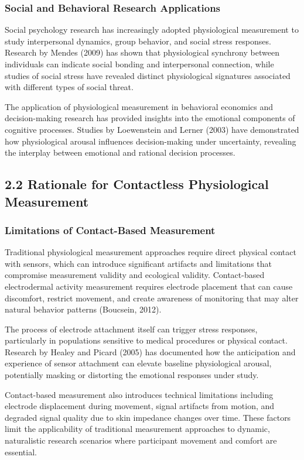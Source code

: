 \documentclass[11pt,a4paper]{article}
\begin{document}
\subsubsection{Social and Behavioral Research Applications}

Social psychology research has increasingly adopted physiological measurement to study interpersonal dynamics, group
behavior, and social stress responses. Research by Mendes (2009) has shown that physiological synchrony between
individuals can indicate social bonding and interpersonal connection, while studies of social stress have revealed
distinct physiological signatures associated with different types of social threat.

The application of physiological measurement in behavioral economics and decision-making research has provided insights
into the emotional components of cognitive processes. Studies by Loewenstein and Lerner (2003) have demonstrated how
physiological arousal influences decision-making under uncertainty, revealing the interplay between emotional and
rational decision processes.

\subsection{2.2 Rationale for Contactless Physiological Measurement}

\subsubsection{Limitations of Contact-Based Measurement}

Traditional physiological measurement approaches require direct physical contact with sensors, which can introduce
significant artifacts and limitations that compromise measurement validity and ecological validity. Contact-based
electrodermal activity measurement requires electrode placement that can cause discomfort, restrict movement, and create
awareness of monitoring that may alter natural behavior patterns (Boucsein, 2012).

The process of electrode attachment itself can trigger stress responses, particularly in populations sensitive to
medical procedures or physical contact. Research by Healey and Picard (2005) has documented how the anticipation and
experience of sensor attachment can elevate baseline physiological arousal, potentially masking or distorting the
emotional responses under study.

Contact-based measurement also introduces technical limitations including electrode displacement during movement, signal
artifacts from motion, and degraded signal quality due to skin impedance changes over time. These factors limit the
applicability of traditional measurement approaches to dynamic, naturalistic research scenarios where participant
movement and comfort are essential.
\end{document}
